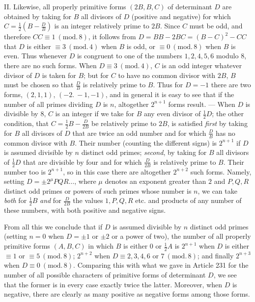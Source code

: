 II. Likewise, all properly primitive forms \((2B,B,C)\) of determinant \(D\) are obtained by taking for \(B\) all divisors of \(D\) (positive and negative) for which \(C=\frac12(B-\frac{D}{B})\) is an integer relatively prime to \(2B\). Since \(C\) must be odd, and therefore \(CC\equiv1\ (\mathrm{mod.}\,8)\), it follows from \(D=BB-2BC=(B-C)^2-CC\) that \(D\) is either \(\equiv3\ (\mathrm{mod.}\,4)\) when \(B\) is odd, or \(\equiv0\ (\mathrm{mod.}\,8)\) when \(B\) is even. Thus whenever \(D\) is congruent to one of the numbers \(1,2,4,5,6\) modulo \(8\), there are no such forms. When \(D\equiv3\ (\mathrm{mod.}\,4)\), \(C\) is an odd integer whatever divisor of \(D\) is taken for \(B\); but for \(C\) to have no common divisor with \(2B\), \(B\) must be chosen so that \(\frac{D}{B}\) is relatively prime to \(B\). Thus for \(D=-1\) there are two forms, \((2,1,1)\), \((-2.\ -1,-1)\), and in general it is easy to see that if the number of all primes dividing \(D\) is \(n\), altogether \(2^{n+1}\) forms result. --- When \(D\) is divisible by \(8\), \(C\) is an integer if we take for \(B\) any even divisor of \(\frac12 D\); the other condition, that \(C=\frac12 B-\frac{D}{2B}\) be relatively prime to \(2B\), is satisfied \textit{first} by taking for \(B\) all divisors of \(D\) that are twice an odd number and for which \(\frac{D}{B}\) has no common divisor with \(B\). Their number (counting the different signs) is \(2^{n+1}\) if \(D\) is assumed divisible by \(n\) distinct odd primes; \textit{second}, by taking for \(B\) all divisors of
\(\frac12 D\) that are divisible by four and for which \(\frac{D}{2B}\) is relatively prime to \(B\). Their number too is \(2^{n+1}\), so in this case there are altogether \(2^{n+2}\) such forms. Namely, setting \(D=\pm2^\mu PQR\ldots\), where \(\mu\) denotes an exponent greater than \(2\) and \(P,Q,R\) distinct odd primes or powers of such primes whose number is \(n\), we can take \textit{both} for \(\frac12 B\) \textit{and} for \(\frac{D}{2B}\) the values \(1,P,Q,R\) etc. and products of any number of these numbers, with both positive and negative signs.

From all this we conclude that if \(D\) is assumed divisible by \(n\) distinct odd primes (setting \(n=0\) when \(D=\pm1\) or \(\pm2\) or a power of two), the number of all properly primitive forms \((A,B,C)\) in which \(B\) is either \(0\) or \(\frac12 A\) is \(2^{n+1}\) when \(D\) is either \(\equiv1\) or \(\equiv5\ (\mathrm{mod.}\,8)\); \(2^{n+2}\) when \(D\equiv2,3,4,6\text{ or }7\ (\mathrm{mod.}\,8)\); and finally \(2^{n+3}\) when \(D\equiv0\ (\mathrm{mod.}\,8)\). Comparing this with what we gave in Article 231 for the number of all possible characters of primitive forms of determinant \(D\), we see that the former is in every case exactly twice the latter. Moreover, when \(D\) is negative, there are clearly as many positive as negative forms among those forms.
